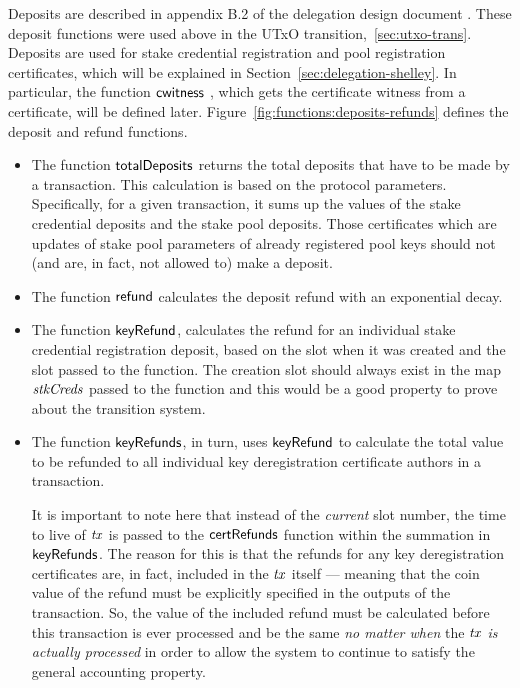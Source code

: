 Deposits are described in appendix B.2 of the delegation design document
\cite{delegation_design}.  These deposit functions were used above in the UTxO
transition,~\ref{sec:utxo-trans}. Deposits are used for stake credential
registration and pool registration certificates, which will be explained in
Section~\ref{sec:delegation-shelley}.  In particular, the function
$\mathsf{cwitness}~ \mathit{}$, which gets the certificate witness from a certificate, will be
defined later.  Figure~\ref{fig:functions:deposits-refunds} defines the deposit
and refund functions.
\begin{itemize}
\item The function $\mathsf{totalDeposits}$ returns the total deposits that have to be
  made by a transaction.  This calculation is based on the protocol parameters.
  Specifically, for a given transaction, it sums up the values of the stake
  credential deposits and the stake pool deposits. Those certificates which are
  updates of stake pool parameters of already registered pool keys should not
  (and are, in fact, not allowed to) make a deposit.
  \item The function $\mathsf{refund}$ calculates the deposit refund with an exponential decay.
  \item The function $\mathsf{keyRefund}$, calculates the refund for an individual
    stake credential registration deposit, based on the slot when it was created
    and the slot passed to the function. The creation slot should always exist
    in the map $\mathit{stkCreds}$ passed to the function and this would be a good
    property to prove about the transition system.
  \item The function $\mathsf{keyRefunds}$, in turn, uses $\mathsf{keyRefund}$ to calculate
    the total value to be refunded to all individual key deregistration certificate authors
    in a transaction.

    It is important to note here that instead of the \textit{current} slot number,
    the time to live of $\mathit{tx}$ is passed to the $\mathsf{certRefunds}$ function
    within the summation in $\mathsf{keyRefunds}$. The reason for this is that the
    refunds for any key deregistration certificates are, in fact, included in
    the $\mathit{tx}$ itself --- meaning that the coin value of the refund must be
    explicitly specified in the outputs of the transaction. So,
    the value of the included refund must be calculated before this transaction
    is ever processed and be the same \textit{no matter when} the $\mathit{tx}$
    \textit{is actually processed} in order to allow the system to continue to
    satisfy the general accounting property.


\end{itemize}
